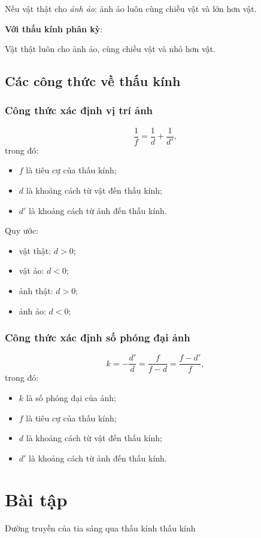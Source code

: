 Nếu vật thật cho \textit{ảnh ảo}: ảnh ảo luôn cùng chiều vật và lớn hơn vật.

\textbf{Với thấu kính phân kỳ}:

Vật thật luôn cho ảnh ảo, cùng chiều vật và nhỏ hơn vật. 
\subsection{Các công thức về thấu kính}
\subsubsection{Công thức xác định vị trí ảnh}
\begin{equation}
\dfrac{1}{f}=\dfrac{1}{d}+\dfrac{1}{d'},
\end{equation}
trong đó:
\begin{itemize}
	\item $f$ là tiêu cự của thấu kính;
	\item $d$ là khoảng cách từ vật đến thấu kính;
	\item $d'$ là khoảng cách từ ảnh đến thấu kính. 
\end{itemize}
Quy ước: 
\begin{itemize}
	\item vật thật: $d>0$;
	\item vật ảo: $d<0$;
	\item ảnh thật: $d>0$;
	\item ảnh ảo: $d<0$;
\end{itemize}
\subsubsection{Công thức xác định số phóng đại ảnh}
\begin{equation}
k=-\dfrac{d'}{d}=\dfrac{f}{f-d}=\dfrac{f-d'}{f},
\end{equation}
trong đó:
\begin{itemize}
	\item $k$ là số phóng đại của ảnh;
	\item $f$ là tiêu cự của thấu kính;
	\item $d$ là khoảng cách từ vật đến thấu kính;
	\item $d'$ là khoảng cách từ ảnh đến thấu kính. 
\end{itemize}


\section{Bài tập }
\begin{dang}{Đường truyền của tia sáng qua thấu  kính thấu kính}
\end{dang}


